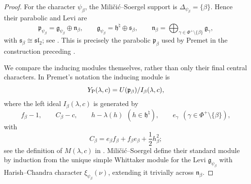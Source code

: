 \documentclass[11pt]{amsart}
\theoremstyle{remark}
\numberwithin{equation}{section}
\begin{document}
\begin{proof}
For the character \(\psi_\beta\), the Mili\v{c}i\'c--Soergel support is
\(\Delta_{\psi_\beta}=\{\beta\}\).  Hence their parabolic and Levi are
\begin{equation}
\label{eq:MS-rank-one-parabolic}
   \mathfrak p_{\psi_\beta}
   =\mathfrak g_{\psi_\beta}\oplus\mathfrak n_\beta,
   \qquad
   \mathfrak g_{\psi_\beta}
   =\mathfrak h^\natural\oplus\mathfrak s_\beta,
   \qquad
   \mathfrak n_\beta
   =\bigoplus_{\gamma\in\Phi^+\setminus\{\beta\}}\mathfrak g_\gamma,
\end{equation}
with \(\mathfrak s_\beta\cong\mathfrak{sl}_2\); see
\cite[Section~2]{MilicicSoergel1997}.  This is precisely the parabolic
\(\mathfrak p_\beta\) used by Premet in the construction preceding
\cite[Theorem~1.3]{Premet2007}.

We compare the inducing modules themselves, rather than only their final
central characters.  In Premet's notation the inducing module is
\[
   Y_{\rm P}(\lambda,c)
   =U(\mathfrak p_\beta)/I_\beta(\lambda,c),
\]
where the left ideal \(I_\beta(\lambda,c)\) is generated by
\begin{equation}
\label{eq:Premet-inducing-relations}
   f_\beta-1,
   \qquad C_\beta-c,
   \qquad h-\lambda(h)\ \ (h\in\mathfrak h^\natural),
   \qquad e_\gamma\ \ (\gamma\in\Phi^+\setminus\{\beta\}),
\end{equation}
with
\[
   C_\beta=e_\beta f_\beta+f_\beta e_\beta
            +\frac12h_\beta^2;
\]
see the definition of \(M(\lambda,c)\) in
\cite[Section~7.3]{Premet2007}.  Mili\v{c}i\'c--Soergel define their
standard module by induction from the unique simple Whittaker module for
the Levi \(\mathfrak g_{\psi_\beta}\) with Harish--Chandra character
\(\xi_{\psi_\beta}(\nu)\), extending it trivially across
\(\mathfrak n_\beta\).


\end{proof}
\end{document}
